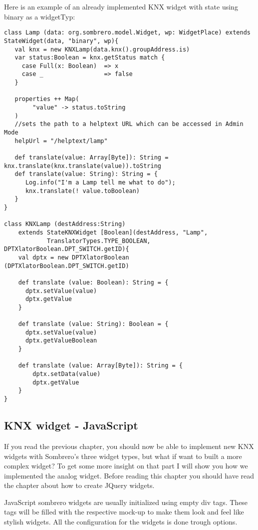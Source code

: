 Here is an example of an already implemented KNX widget with state using binary as a widgetTyp:
\begin{lstlisting}[caption=widget lamp: Lamp.scala,label=lst:h2h:lampwidget]
class Lamp (data: org.sombrero.model.Widget, wp: WidgetPlace) extends StateWidget(data, "binary", wp){
   val knx = new KNXLamp(data.knx().groupAddress.is)
   var status:Boolean = knx.getStatus match {
     case Full(x: Boolean)	=> x
     case _					=> false
   }

   properties ++ Map(
     	"value" -> status.toString
   )
   //sets the path to a helptext URL which can be accessed in Admin Mode
   helpUrl = "/helptext/lamp"

   def translate(value: Array[Byte]): String = knx.translate(knx.translate(value)).toString
   def translate(value: String): String = {
      Log.info("I'm a Lamp tell me what to do");
      knx.translate(! value.toBoolean)
   }
}

class KNXLamp (destAddress:String)
	extends StateKNXWidget [Boolean](destAddress, "Lamp",
			TranslatorTypes.TYPE_BOOLEAN, DPTXlatorBoolean.DPT_SWITCH.getID){
	val dptx = new DPTXlatorBoolean (DPTXlatorBoolean.DPT_SWITCH.getID)

    def translate (value: Boolean): String = {
      dptx.setValue(value)
      dptx.getValue
    }

    def translate (value: String): Boolean = {
      dptx.setValue(value)
      dptx.getValueBoolean
    }

    def translate (value: Array[Byte]): String = {
		dptx.setData(value)
		dptx.getValue
    }
}
\end{lstlisting}

\subsection{KNX widget - JavaScript}
    If you read the previous chapter, you should now be able to implement new KNX widgets with Sombrero's three widget types, but what if want to built a more complex widget? To get some more insight on that part I will show you how we implemented the analog widget. Before reading this chapter you should have read the chapter about how to create JQuery widgets.

    JavaScript sombrero widgets are usually initialized using empty div tags. These tags will be filled with the respective mock-up to make them look and feel like stylish widgets. All the configuration for the widgets is done trough options.

